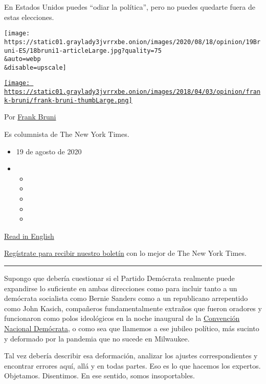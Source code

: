 En Estados Unidos puedes ``odiar la política'', pero no puedes quedarte
fuera de estas elecciones.

\texttt{[image: https://static01.graylady3jvrrxbe.onion/images/2020/08/18/opinion/19Bruni-ES/18bruni1-articleLarge.jpg?quality=75\\\&auto=webp\\\&disable=upscale]}

\href{https://www.nytimes3xbfgragh.onion/by/frank-bruni}{\texttt{[image: https://static01.graylady3jvrrxbe.onion/images/2018/04/03/opinion/frank-bruni/frank-bruni-thumbLarge.png]}}

Por \href{https://www.nytimes3xbfgragh.onion/by/frank-bruni}{Frank
Bruni}

Es columnista de The New York Times.

\begin{itemize}
\item
  19 de agosto de 2020
\item
  \begin{itemize}
  \item
  \item
  \item
  \item
  \item
  \end{itemize}
\end{itemize}

\href{https://www.nytimes3xbfgragh.onion/2020/08/18/opinion/michelle-obama-dnc-election-2020.html}{Read
in English}

\href{https://www.nytimes3xbfgragh.onion/newsletters/el-times}{Regístrate
para recibir nuestro boletín} con lo mejor de The New York Times.

\begin{center}\rule{0.5\linewidth}{\linethickness}\end{center}

Supongo que debería cuestionar si el Partido Demócrata realmente puede
expandirse lo suficiente en ambas direcciones como para incluir tanto a
un demócrata socialista como Bernie Sanders como a un republicano
arrepentido como John Kasich, compañeros fundamentalmente extraños que
fueron oradores y funcionaron como polos ideológicos en la noche
inaugural de la
\href{https://www.nytimes3xbfgragh.onion/es/2020/08/18/espanol/estados-unidos/horario-cnd-convencion-democrata.html}{Convención
Nacional Demócrata}, o como sea que llamemos a ese jubileo político, más
sucinto y deformado por la pandemia que no sucede en Milwaukee.

Tal vez debería describir esa deformación, analizar los ajustes
correspondientes y encontrar errores aquí, allá y en todas partes. Eso
es lo que hacemos los expertos. Objetamos. Disentimos. En ese sentido,
somos insoportables.

